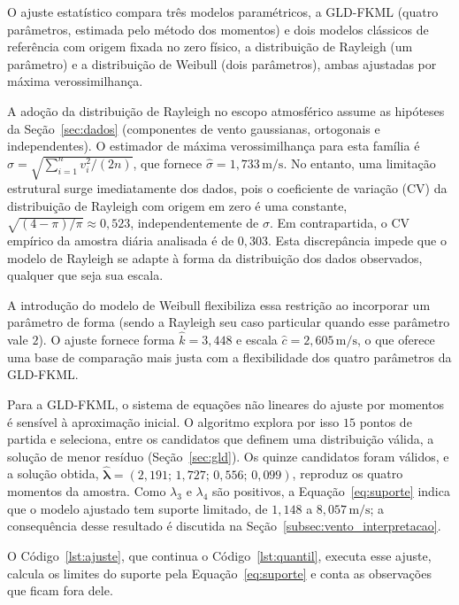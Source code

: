 O ajuste estatístico compara três modelos paramétricos, a GLD-FKML (quatro parâmetros, estimada pelo método dos momentos) e dois modelos clássicos de referência com origem fixada no zero físico, a distribuição de Rayleigh (um parâmetro) e a distribuição de Weibull (dois parâmetros), ambas ajustadas por máxima verossimilhança.

A adoção da distribuição de Rayleigh no escopo atmosférico assume as hipóteses da Seção~\ref{sec:dados} (componentes de vento gaussianas, ortogonais e independentes). O estimador de máxima verossimilhança para esta família é $\widehat\sigma = \sqrt{\sum_{i=1}^n v_i^2 / (2n)}$, que fornece $\widehat\sigma = 1,733\,\text{m/s}$. No entanto, uma limitação estrutural surge imediatamente dos dados, pois o coeficiente de variação (CV) da distribuição de Rayleigh com origem em zero é uma constante, $\sqrt{(4-\pi)/\pi} \approx 0,523$, independentemente de $\sigma$. Em contrapartida, o CV empírico da amostra diária analisada é de $0,303$. Esta discrepância impede que o modelo de Rayleigh se adapte à forma da distribuição dos dados observados, qualquer que seja sua escala.

A introdução do modelo de Weibull flexibiliza essa restrição ao incorporar um parâmetro de forma (sendo a Rayleigh seu caso particular quando esse parâmetro vale $2$). O ajuste fornece forma $\widehat k = 3,448$ e escala $\widehat c = 2,605\,\text{m/s}$, o que oferece uma base de comparação mais justa com a flexibilidade dos quatro parâmetros da GLD-FKML.

Para a GLD-FKML, o sistema de equações não lineares do ajuste por momentos é sensível à aproximação inicial. O algoritmo explora por isso $15$ pontos de partida e seleciona, entre os candidatos que definem uma distribuição válida, a solução de menor resíduo (Seção~\ref{sec:gld}). Os quinze candidatos foram válidos, e a solução obtida, $\widehat{\boldsymbol\lambda} = (2,191;\, 1,727;\, 0,556;\, 0,099)$, reproduz os quatro momentos da amostra. Como $\lambda_3$ e $\lambda_4$ são positivos, a Equação~\eqref{eq:suporte} indica que o modelo ajustado tem suporte limitado, de $1,148$ a $8,057\,\text{m/s}$; a consequência desse resultado é discutida na Seção~\ref{subsec:vento_interpretacao}.

O Código~\ref{lst:ajuste}, que continua o Código~\ref{lst:quantil}, executa esse ajuste, calcula os limites do suporte pela Equação~\eqref{eq:suporte} e conta as observações que ficam fora dele.



